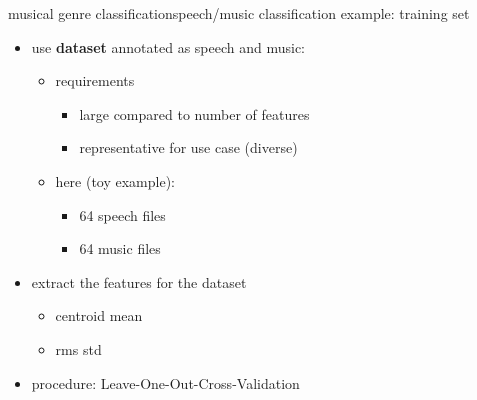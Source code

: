         \begin{frame}{musical genre classification}{speech/music classification example: training set}
            \begin{itemize}
                \item	use \textbf{dataset} annotated as speech and music:
                    \begin{itemize}
                        \item	requirements
                            \begin{itemize}
                                \item	large compared to number of features
                                \item	representative for use case (diverse)
                            \end{itemize}
                        \item	here (toy example):
                            \begin{itemize}
                                \item	64 speech files
                                \item	64 music files
                            \end{itemize}
                    \end{itemize}
                \bigskip
                \item	extract the features for the dataset
                    \begin{itemize}
                        \item   centroid mean
                        \item   rms std
                    \end{itemize}
                \bigskip
                \item	procedure: Leave-One-Out-Cross-Validation
            \end{itemize}
        \end{frame}

